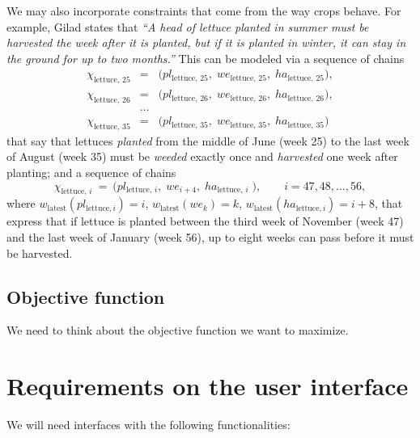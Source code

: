 \documentclass[11pt,reqno]{amsart}
\numberwithin{equation}{section}
\begin{document}
We may also incorporate constraints that come from the way crops behave. For example,
Gilad states that \emph{``A head of lettuce planted in summer must be harvested
  the week after it is planted, but if it is planted in winter, it can stay in the ground
  for up to two months.''} This can be modeled via a sequence of chains 
\begin{eqnarray*}
   \chi_{\text{lettuce},\, 25} 
   &=& 
   \big(
      pl_{\text{lettuce},\, 25}, \; 
      we_{\text{lettuce},\, 25}, \;
      ha_{\text{lettuce},\, 25}
      \big), \\
   \chi_{\text{lettuce},\, 26} 
   &=& 
   \big(
      pl_{\text{lettuce},\, 26}, \; 
      we_{\text{lettuce},\, 26}, \;
      ha_{\text{lettuce},\, 26}
      \big), \\
   &\dots& \\
   \chi_{\text{lettuce},\, 35} 
   &=& 
   \big(
      pl_{\text{lettuce},\, 35}, \; 
      we_{\text{lettuce},\, 35}, \;
      ha_{\text{lettuce},\, 35}
      \big)
\end{eqnarray*}
that say that lettuces \emph{planted} from the middle of June (week 25) to the last week
of August (week 35) must be \emph{weeded} exactly once and \emph{harvested} one week after
planting; and a sequence of chains
\[
    \chi_{\text{lettuce},\, i} 
   \ = \ 
   \big(
      pl_{\text{lettuce},\, i}, \; 
      we_{i+4}, \;
      ha_{\text{lettuce},\, i} \;
      \big),
      \qquad i=47,48,\dots, 56,
\]
where $w_{\text{latest}}(pl_{\text{lettuce},i})=i$, $w_{\text{latest}}(we_k)=k$,
$w_{\text{latest}}(ha_{\text{lettuce},i})=i+8$, that express that if lettuce is planted
between the third week of November (week 47) and the last week of January (week 56), up to
eight weeks can pass before it must be harvested.


\subsection{Objective function}

We need to think about the objective function we want to  maximize.


\section{Requirements on the user interface}

We will need interfaces with the following functionalities:
\end{document}

